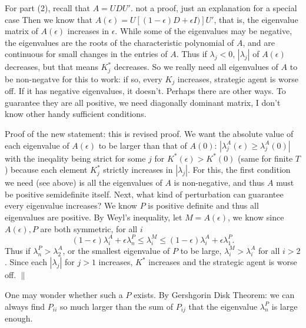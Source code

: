 \documentclass{article}
\newcommand{\wl}[1]{{\color{blue} #1}}
\begin{document}
For part (2), recall that $A=UDU'$. \wl{not a proof, just an explanation for a special case} Then we know that $A(\epsilon)=U[(1-\epsilon)D+\epsilon I)]U'$, that is, the eigenvalue matrix of $A(\epsilon)$ increases in $\epsilon$. While some of the eigenvalues may be negative, the eigenvalues are the roots of the characteristic polynomial of $A$, and are continuous for small changes in the entries of $A$. Thus if $\lambda_j<0$, $|\lambda_j|$ of $A(\epsilon)$ decreases, but that means $K_j^*$ decreases. So we really need all eigenvalues of $A$ to be non-negatve for this to work: if  so, every $K_j$ increases, strategic agent is worse off. If it has negative eigenvalues, it doesn't. Perhaps there are other ways. To guarantee they are all positive, we need diagonally dominant matrix, I don't know other handy sufficient conditions.

Proof of the new statement: \wl{this is revised proof}. We want the absolute value of each eigenvalue of $A(\epsilon)$ to be larger than that of $A(0)$: $|\lambda_j^A(\epsilon)\geq \lambda_j^A(0)| $ with the ineqality being strict for some $j$ for $K^*(\epsilon)>K^*(0)$ (same for finite $T$) because each element $K_j^*$ strictly increases in $|\lambda_j|$. For this, the first condition we need (see above) is all the eigenvalues of $A$ is non-negative, and thus $A$ must be positive semidefinite itself. Next, what kind of perturbation can guarantee every eigenvalue increases? We know $P$ is positive definite and thus all eigenvalues are positive. By Weyl's inequality, let $M=A(\epsilon)$,  we know since $A(\epsilon),P$ are both symmetric, for all $i$ 
$$(1-\epsilon)\lambda_i^A+\epsilon\lambda_n^P\leq \lambda_i^M\leq (1-\epsilon)\lambda_i^A+\epsilon\lambda_1^P.$$ 
Thus if $\lambda_n^P> \lambda_2^A$, or the smallest eigenvalue of $P$ to be large, $\lambda_i^M>\lambda_i^A$ for all $i>2$. Since each $|\lambda_j|$ for $j>1$ increases, $K^*$ increases and the strategic agent is worse off. $\|$

One may wonder whether such a $P$ exists. By Gershgorin Disk Theorem: we can always find $P_{ii}$ so much larger than the sum of $P_{ij}$ that the eigenvalue $\lambda_n^P$ is large enough. 
\end{document}
